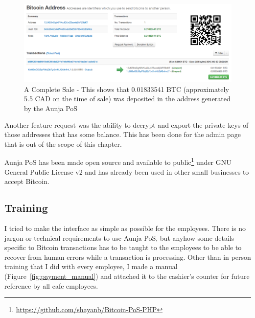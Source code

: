 \begin{figure}
\centering
\includegraphics[width=\linewidth]{fig/complete_sale.png}
  \caption{A Complete Sale - This shows that 0.01833541 BTC (approximately 5.5 CAD on the time of sale) was deposited in the address generated by the Aunja PoS} 
\label{fig:report_page}
\end{figure}


Another feature request was the ability to decrypt and export the private keys of those addresses that has some balance. This has been done for the admin page that is out of the scope of this chapter. 

Aunja PoS has been made open source and available to public\footnote{\url{https://github.com/shayanb/Bitcoin-PoS-PHP}} under GNU General Public License v2 and has already been used in other small businesses to accept Bitcoin.

\subsection{Training}

I tried to make the interface as simple as possible for the employees. There is no jargon or technical requirements to use Aunja PoS, but anyhow some details specific to Bitcoin transactions has to be taught to the employees to be able to recover from human errors while a transaction is processing.
Other than in person training that I did with every employee, I made a manual (Figure~\ref{fig:payment_manual}) and attached it to the cashier's counter for future reference by all cafe employees.


